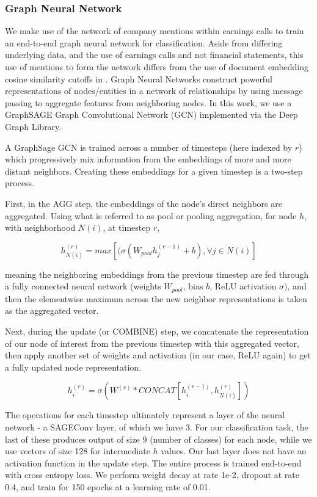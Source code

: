 \documentclass{article}[11pt]
\begin{document}
    \subsubsection*{Graph Neural Network}

    We make use of the network of company mentions within earnings calls to train an end-to-end graph neural network for classification. Aside from differing underlying data, and the use of earnings calls and not financial statements, this use of mentions to form the network differs from the use of document embedding cosine similarity cutoffs in \cite{das_credit_2023}. Graph Neural Networks construct powerful representations of nodes/entities in a network of relationships by using message passing to aggregate features from neighboring nodes. In this work, we use a GraphSAGE \citep{hamilton_inductive_2018} Graph Convolutional Network (GCN) implemented via the Deep Graph Library. \citep{deep_graph_library_deep_2024}


    A GraphSage GCN is trained across a number of timesteps (here indexed by $r$) which progressively mix information from the embeddings of more and more distant neighbors. Creating these embeddings for a given timestep is a two-step process.

    First, in the AGG step, the embeddings of the node's direct neighbors are aggregated. Using what is referred to as pool or pooling aggregation, for node $h$, with neighborhood $N(i)$, at timestep $r$,

    \[
    h_{N(i)}^{(r)}=max[(\sigma(W_{pool}h_{j}^{(r-1)}+b),\forall j\in N(i)]
    \]

    meaning the neighboring embeddings from the previous timestep are fed through a fully connected neural network (weights $W_{pool}$, bias $b$, ReLU activation $\sigma)$, and then the elementwise maximum across the new neighbor representations is taken as the aggregated vector.

    Next, during the update (or COMBINE) step, we concatenate the representation of our node of interest from the previous timestep with this aggregated vector, then apply another set of weights and activation (in our case, ReLU again) to get a fully updated node representation.

    \[
    h_{i}^{(r)}=\sigma(W^{(r)}*CONCAT[h_{i}^{(r-1)},h_{N(i)}^{(r)}])
    \]

    The operations for each timestep ultimately represent a layer of the neural network - a SAGEConv layer, of which we have 3. For our classification task, the last of these produces output of size 9 (number of classes) for each node, while we use vectors of size 128 for intermediate $h$ values. Our last layer does not have an activation function in the update step. The entire process is trained end-to-end with cross entropy loss. We perform weight decay at rate 1e-2, dropout at rate 0.4, and train for 150 epochs at a learning rate of 0.01.
\end{document}
